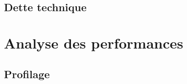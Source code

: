 \documentclass[10pt]{report}
\begin{document}
	\subsection{Dette technique}
	
	
	
	
	
	\section{Analyse des performances}
		\subsection{Profilage}
	
\end{document}
